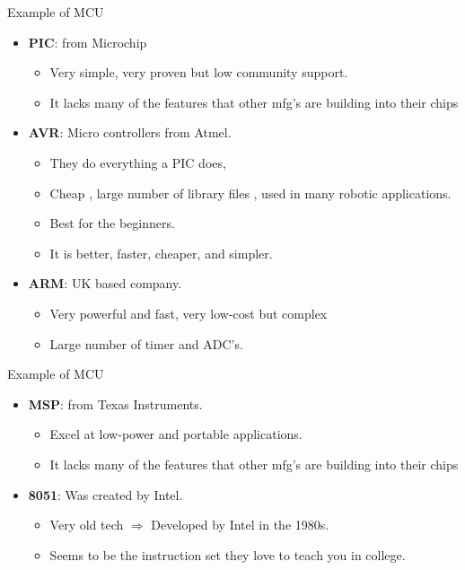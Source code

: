 \documentclass{beamer}
\begin{document}
\begin{darkframes}
\begin{frame}[<+->]{Example of MCU}
	\begin{itemize}
		\item \textbf{PIC}: from Microchip
		\begin{itemize}
			\item Very simple, very proven but low community support. 
			\item It lacks many of the features that other mfg’s are building into their chips
		\end{itemize}
	\item \textbf{AVR}: Micro controllers from  Atmel.
	\begin{itemize} 
		\item They do everything a PIC does,
		\item Cheap , large number of library files , used in many robotic applications.
		\item Best for the beginners. 
		\item It is better, faster, cheaper, and simpler.
	\end{itemize}
  \item \textbf{ARM}: UK based company.
  \begin{itemize}
	\item Very powerful and fast, very low-cost but complex
	\item Large number of timer and ADC's.
 \end{itemize}
	\end{itemize}
\end{frame}    
    
\begin{frame}[<+->]{Example of MCU}
	\begin{itemize}
		\item \textbf{MSP}: from Texas Instruments.
		\begin{itemize}
			\item Excel at low-power and portable applications.
			\item It lacks many of the features that other mfg’s are building into their chips
		\end{itemize}
		\item \textbf{8051}: Was created by Intel.
		\begin{itemize} 
			\item Very old tech $\Rightarrow$ Developed by Intel in the 1980s.
			\item Seems to be the instruction set they love to teach you in college.
		\end{itemize}
	\end{itemize}
\end{frame}    
    

\end{darkframes}
\end{document}

